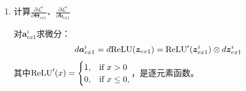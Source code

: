 \documentclass[12pt, a4paper]{article}
\newcommand{\imat}{\bm}
\newcommand{\ivec}{\bm}
\newcommand{\tr}{{\rm tr}}
\newcommand{\relu}{{\rm ReLU}}
\newcommand{\loss}{\mathcal{L}}
\newcommand{\thetam}{\imat{\Theta}}
\newcommand{\deltav}{\ivec{\delta}}
\newcommand{\av}{\ivec{a}}
\newcommand{\bv}{\ivec{b}}
\newcommand{\zv}{\ivec{z}}
\begin{document}
\begin{enumerate}
            继续对$d \zv_{ex2}^i$求微分:
            \begin{align*}
            d \zv_{ex2}^i
            &= d (\thetam_{ex2} \av_{ex1}^i + \bv_{ex2}) \\
            &= d \thetam_{ex2} \av_{ex1}^i + d \bv_{ex2} + \thetam_{ex2} d \av_{ex1}^i
            \end{align*}

            代入$d l_{ex2}^i$中：
            \begin{align*}
            d l_{ex2}^i &= \tr((\deltav_{ex2}^i)^T d \thetam_{ex2} \av_{ex1}^i) \\
                        &+ \tr((\deltav_{ex2}^i)^T d \bv_{ex2}) \\
                        &+ \tr((\deltav_{ex2}^i)^T \thetam_{ex2} d \av_{ex1}^i)
            \end{align*}
            我们简记$d l_{ex1}^i = \tr((\deltav_{ex2}^i)^T \thetam_{ex2} d \av_{ex1}^i)$。

            得到梯度:
            \begin{align*}
            \frac{\partial \loss^i}{\partial \thetam_{ex2}} &= \deltav_{ex2}^i (\av_{ex1}^i)^T \\
            \frac{\partial \loss^i}{\partial \bv_{ex2}} &= \deltav_{ex2}^i
            \end{align*}

            对$\loss^i$求和：
            \begin{align}
            \frac{\partial \loss}{\partial \thetam_{ex2}} &= \frac{1}{m} \sum_{i=1}^{m} \deltav_{ex2}^i (\av_{ex1}^i)^T \\
            \frac{\partial \loss}{\partial \bv_{ex2}} &= \frac{1}{m} \sum_{i=1}^{m} \deltav_{ex2}^i
            \end{align}

        \item 计算$\frac{\partial \loss^i}{\partial \thetam_{ex1}}$、$\frac{\partial \loss^i}{\partial \bv_{ex1}}$

            对$\av_{ex1}^i$求微分：
            \begin{align*}
            d \av_{ex1}^i = d \relu(\zv_{ex1}) = \relu^{\prime}(\zv_{ex1}^i) \otimes d \zv_{ex1}^i
            \end{align*}
            其中$\relu^{\prime}(x) =
                                    \begin{cases}
                                    1, &\text{if $x > 0$} \\
                                    0, &\text{if $x \le 0$,}
                                    \end{cases}$，是逐元素函数。


\end{enumerate}
\end{document}
